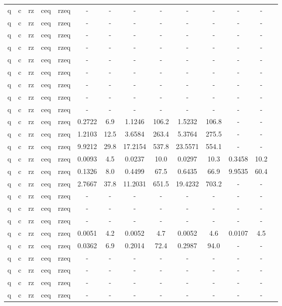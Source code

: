 \begin{table}[htb]
{\begin{tabular}{|c|c|c|c|c|c|c|c|c|c|c|c|c|c|}
q & c & rz & ceq & rzeq & - & - & - & - & - & - & - & - \\ 
q & c & rz & ceq & rzeq & - & - & - & - & - & - & - & - \\ 
q & c & rz & ceq & rzeq & - & - & - & - & - & - & - & - \\ 
q & c & rz & ceq & rzeq & - & - & - & - & - & - & - & - \\ 
q & c & rz & ceq & rzeq & - & - & - & - & - & - & - & - \\ 
q & c & rz & ceq & rzeq & - & - & - & - & - & - & - & - \\ 
q & c & rz & ceq & rzeq & - & - & - & - & - & - & - & - \\ 
q & c & rz & ceq & rzeq & - & - & - & - & - & - & - & - \\ 
q & c & rz & ceq & rzeq & - & - & - & - & - & - & - & - \\ 
q & c & rz & ceq & rzeq & 0.2722 & 6.9 & 1.1246 & 106.2 & 1.5232 & 106.8 & - & - \\ 
q & c & rz & ceq & rzeq & 1.2103 & 12.5 & 3.6584 & 263.4 & 5.3764 & 275.5 & - & - \\ 
q & c & rz & ceq & rzeq & 9.9212 & 29.8 & 17.2154 & 537.8 & 23.5571 & 554.1 & - & - \\ 
q & c & rz & ceq & rzeq & 0.0093 & 4.5 & 0.0237 & 10.0 & 0.0297 & 10.3 & 0.3458 & 10.2 \\ 
q & c & rz & ceq & rzeq & 0.1326 & 8.0 & 0.4499 & 67.5 & 0.6435 & 66.9 & 9.9535 & 60.4 \\ 
q & c & rz & ceq & rzeq & 2.7667 & 37.8 & 11.2031 & 651.5 & 19.4232 & 703.2 & - & - \\ 
q & c & rz & ceq & rzeq & - & - & - & - & - & - & - & - \\ 
q & c & rz & ceq & rzeq & - & - & - & - & - & - & - & - \\ 
q & c & rz & ceq & rzeq & - & - & - & - & - & - & - & - \\ 
q & c & rz & ceq & rzeq & 0.0051 & 4.2 & 0.0052 & 4.7 & 0.0052 & 4.6 & 0.0107 & 4.5 \\ 
q & c & rz & ceq & rzeq & 0.0362 & 6.9 & 0.2014 & 72.4 & 0.2987 & 94.0 & - & - \\ 
q & c & rz & ceq & rzeq & - & - & - & - & - & - & - & - \\ 
q & c & rz & ceq & rzeq & - & - & - & - & - & - & - & - \\ 
q & c & rz & ceq & rzeq & - & - & - & - & - & - & - & - \\ 
q & c & rz & ceq & rzeq & - & - & - & - & - & - & - & - \\ 

\end{tabular}}
\end{table}
